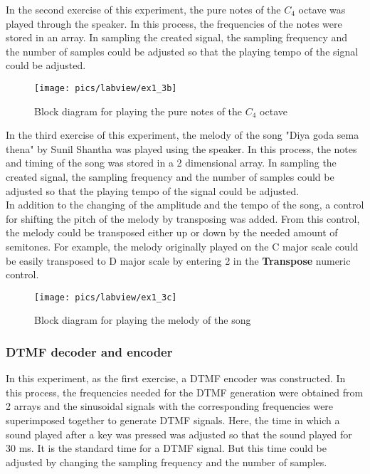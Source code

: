 \noindent
In the second exercise of this experiment, the pure notes of the $C_{4}$ octave was played through the speaker. In this process, the frequencies of the notes were stored in an array. In sampling the created signal, the sampling frequency and the number of samples could be adjusted so that the playing tempo of the signal could be adjusted.

\begin{figure}[!h]
 	\centering
 	\texttt{[image: pics/labview/ex1\_3b]}
 	\caption{Block diagram for playing the pure notes of the $C_{4}$ octave }
 	\label{fig:ex4}
\end{figure}

\noindent
In the third exercise of this experiment, the melody of the song "Diya goda sema thena" by Sunil Shantha was played using the speaker. In this process, the notes and timing of the song was stored in a 2 dimensional array. In sampling the created signal, the sampling frequency and the number of samples could be adjusted so that the playing tempo of the signal could be adjusted. \\

\noindent
In addition to the changing of the amplitude and the tempo of the song, a control for shifting the pitch of the melody by transposing was added. From this control, the melody could be transposed either up or down by the needed amount of semitones. For example, the melody originally played on the C major scale could be easily transposed to D major scale by entering 2 in the \textbf{Transpose} numeric control.

\pagebreak
\begin{figure}[!h]
	\centering
	\texttt{[image: pics/labview/ex1\_3c]}
	\caption{Block diagram for playing the melody of the song}
	\label{fig:ex5}
\end{figure}

\pagebreak
\subsubsection{DTMF decoder and encoder}

In this experiment, as the first exercise, a DTMF encoder was constructed. In this process, the frequencies needed for the DTMF generation were obtained from 2 arrays and the sinusoidal signals with the corresponding frequencies were superimposed together to generate DTMF signals. Here, the time in which a sound played after a key was pressed was adjusted so that the sound played for 30 ms. It is the standard time for a DTMF signal. But this time could be adjusted by changing the sampling frequency and the number of samples.

